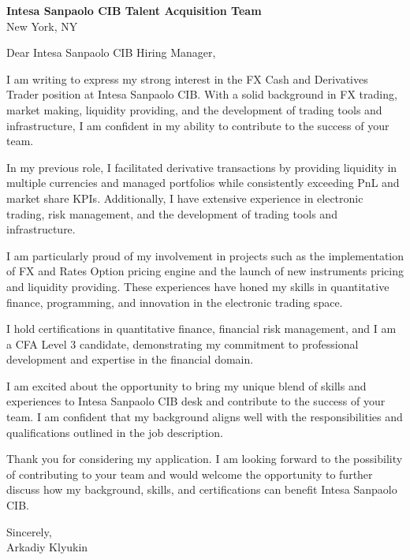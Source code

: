 \documentclass{letter}
\begin{document}
\begin{letter}{\textbf{Intesa Sanpaolo CIB Talent Acquisition Team} \\
                New York, NY}


\opening{Dear Intesa Sanpaolo CIB Hiring Manager,}

I am writing to express my strong interest in the FX Cash and Derivatives Trader position at Intesa Sanpaolo CIB. With a solid background in FX trading, market making, liquidity providing, and the development of trading tools and infrastructure, I am confident in my ability to contribute to the success of your team.

In my previous role, I facilitated derivative transactions by providing liquidity in multiple currencies and managed portfolios while consistently exceeding PnL and market share KPIs. Additionally, I have extensive experience in electronic trading, risk management, and the development of trading tools and infrastructure.

I am particularly proud of my involvement in projects such as the implementation of FX and Rates Option pricing engine and the launch of new instruments pricing and liquidity providing. These experiences have honed my skills in quantitative finance, programming, and innovation in the electronic trading space.

I hold certifications in quantitative finance, financial risk management, and I am a CFA Level 3 candidate, demonstrating my commitment to professional development and expertise in the financial domain.

I am excited about the opportunity to bring my unique blend of skills and experiences to Intesa Sanpaolo CIB desk and contribute to the success of your team. I am confident that my background aligns well with the responsibilities and qualifications outlined in the job description.

Thank you for considering my application. I am looking forward to the possibility of contributing to your team and would welcome the opportunity to further discuss how my background, skills, and certifications can benefit Intesa Sanpaolo CIB.

Sincerely,\\
Arkadiy Klyukin
\end{letter}
\end{document}
